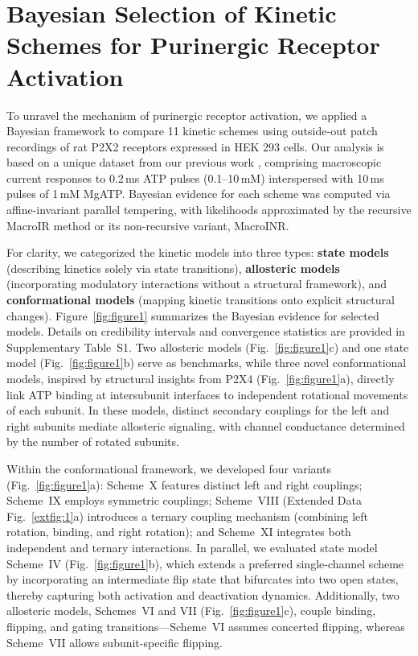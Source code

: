 \documentclass[pdflatex,sn-nature]{sn-jnl}%
\begin{document}
\section{Bayesian Selection of Kinetic Schemes for Purinergic Receptor Activation}
To unravel the mechanism of purinergic receptor activation, we applied a Bayesian framework to compare 11 kinetic schemes using outside‐out patch recordings of rat P2X2 receptors expressed in HEK 293 cells. Our analysis is based on a unique dataset from our previous work \cite{Moffatt_hume}, comprising macroscopic current responses to 0.2\,ms ATP pulses (0.1–10\,mM) interspersed with 10\,ms pulses of 1\,mM MgATP. Bayesian evidence for each scheme was computed via affine-invariant parallel tempering, with likelihoods approximated by the recursive MacroIR method or its non-recursive variant, MacroINR.

For clarity, we categorized the kinetic models into three types: \textbf{state models} (describing kinetics solely via state transitions), \textbf{allosteric models} (incorporating modulatory interactions without a structural framework), and \textbf{conformational models} (mapping kinetic transitions onto explicit structural changes). Figure~\ref{fig:figure1} summarizes the Bayesian evidence for selected models. Details on credibility intervals and convergence statistics are provided in Supplementary Table~S1. Two allosteric models (Fig.~\ref{fig:figure1}c) and one state model (Fig.~\ref{fig:figure1}b) serve as benchmarks, while three novel conformational models, inspired by structural insights from P2X4 (Fig.~\ref{fig:figure1}a), directly link ATP binding at intersubunit interfaces to independent rotational movements of each subunit. In these models, distinct secondary couplings for the left and right subunits mediate allosteric signaling, with channel conductance determined by the number of rotated subunits.

Within the conformational framework, we developed four variants (Fig.~\ref{fig:figure1}a): Scheme~X features distinct left and right couplings; Scheme~IX employs symmetric couplings; Scheme~VIII (Extended Data Fig.~\ref{extfig:1}a) introduces a ternary coupling mechanism (combining left rotation, binding, and right rotation); and Scheme~XI integrates both independent and ternary interactions. In parallel, we evaluated state model Scheme~IV (Fig.~\ref{fig:figure1}b), which extends a preferred single-channel scheme by incorporating an intermediate flip state that bifurcates into two open states, thereby capturing both activation and deactivation dynamics. Additionally, two allosteric models, Schemes~VI and VII (Fig.~\ref{fig:figure1}c), couple binding, flipping, and gating transitions—Scheme~VI assumes concerted flipping, whereas Scheme~VII allows subunit-specific flipping.
\end{document}
